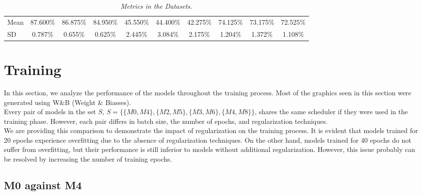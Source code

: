 \begin{landscape}
\begin{table}
\begin{tabular}{lccccccccc}
      \midrule

      \cellcolor{gray!50}Mean & \cellcolor{gray!50}87.600\% & \cellcolor{gray!50}86.875\% & \cellcolor{gray!50}84.950\% & \cellcolor{gray!50}45.550\% & \cellcolor{gray!50}44.400\% & \cellcolor{gray!50}42.275\% & \cellcolor{gray!50}74.125\% & \cellcolor{gray!50}73.175\% & \cellcolor{gray!50}72.525\% \\
      \cellcolor{gray!50}SD & \cellcolor{gray!50}0.787\% & \cellcolor{gray!50}0.655\% & \cellcolor{gray!50}0.625\% & \cellcolor{gray!50}2.445\% & \cellcolor{gray!50}3.084\% & \cellcolor{gray!50}2.175\% & \cellcolor{gray!50}1.204\% & \cellcolor{gray!50}1.372\% &  \cellcolor{gray!50}1.108\% \\

      \bottomrule
    \end{tabular}
    \caption[Metrics in the Datasets]
    {\textit{Metrics in the Datasets. }}
    {\label{table:resume-metrics}}
  \end{table}

\end{landscape}


\section{Training}

In this section, we analyze the performance of the models throughout the
training process. Most of the graphics seen in this section were generated
using W\&B (Weight \& Biasses).\\


Every pair of models in the set \(S\), \(S=\{\{M0, M4\}, \{M2, M5\}, \{M3,
M6\}, \{M4, M8\}\}\), shares the same scheduler if they were used in the
training phase. However, each pair differs in batch size, the number of epochs,
and regularization techniques. \\

We are providing this comparison to demonstrate the impact of regularization on
the training process. It is evident that models trained for 20 epochs
experience overfitting due to the absence of regularization techniques. On the
other hand, models trained for 40 epochs do not suffer from overfitting, but
their performance is still inferior to models without additional
regularization. However, this issue probably can be resolved by increasing the
number of training epochs.

\subsection{M0 against M4}

